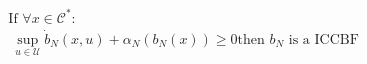 \documentclass[preview]{standalone}
\begin{document}
\begin{align*}
&\text{If }\forall x \in \mathcal{C}^*:\\ &\ \sup_{u \in \mathcal{U}} \dot b_N(x, u) + \alpha_N(b_N(x)) \geq 0 \text{then } b_N \text{ is a ICCBF}
\end{align*}
\end{document}
